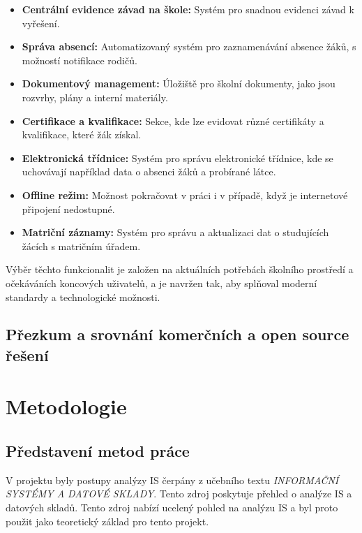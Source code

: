 \documentclass[FM,Proj]{tulthesis}
\begin{document}
\begin{itemize}
    \item \textbf{Centrální evidence závad na škole:} Systém pro snadnou evidenci závad k vyřešení.

    \item \textbf{Správa absencí:} Automatizovaný systém pro zaznamenávání absence žáků, s možností notifikace rodičů.
    
    \item \textbf{Dokumentový management:} Úložiště pro školní dokumenty, jako jsou rozvrhy, plány a interní materiály.
    
    \item \textbf{Certifikace a kvalifikace:} Sekce, kde lze evidovat různé certifikáty a kvalifikace, které žák získal.

    \item \textbf{Elektronická třídnice:} Systém pro správu elektronické třídnice, kde se uchovávají například data 
    o absenci žáků a probírané látce.
    
    \item \textbf{Offline režim:} Možnost pokračovat v práci i v případě, když je internetové připojení nedostupné.

    \item \textbf{Matriční záznamy:} Systém pro správu a aktualizaci dat o studujících žácích s matričním úřadem.

\end{itemize}

Výběr těchto funkcionalit je založen na aktuálních potřebách školního prostředí a očekáváních koncových uživatelů,
a je navržen tak, aby splňoval moderní standardy a technologické možnosti.

\section{Přezkum a srovnání komerčních a open source řešení}


\chapter{Metodologie}
\section{Představení metod práce}
V projektu byly postupy analýzy IS čerpány z učebního textu 
\textit{INFORMAČNÍ SYSTÉMY A DATOVÉ SKLADY}\cite{Sarmanova2008ISaDS}. Tento zdroj poskytuje
přehled o analýze IS a datových skladů. Tento zdroj nabízí ucelený pohled
na analýzu IS a byl proto použit jako teoretický základ
pro tento projekt.
\end{document}
